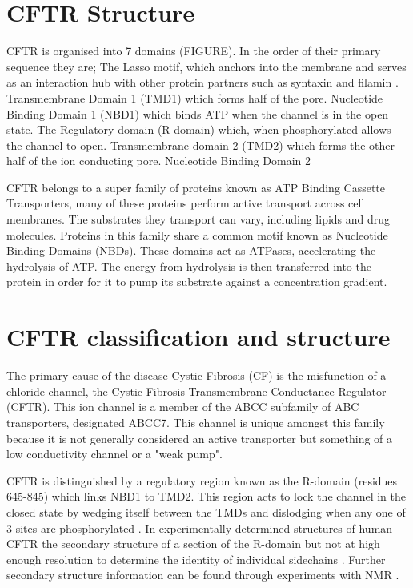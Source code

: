 \section{CFTR Structure}
CFTR is organised into 7 domains (FIGURE). In the order of their primary sequence they are; The Lasso motif, which anchors into the membrane and serves as an interaction hub with other protein partners such as syntaxin and filamin \cite{}. Transmembrane Domain 1 (TMD1) which forms half of the pore. Nucleotide Binding Domain 1 (NBD1) which binds ATP when the channel is in the open state. The Regulatory domain (R-domain) which, when phosphorylated allows the channel to open. Transmembrane domain 2 (TMD2) which forms the other half of the ion conducting pore. Nucleotide Binding Domain 2 

CFTR belongs to a super family of proteins known as ATP Binding Cassette Transporters,  many of these proteins perform active transport across cell membranes. The substrates they transport can vary, including lipids and drug molecules. Proteins in this family share a common motif known as Nucleotide Binding Domains (NBDs). These domains act as ATPases, accelerating the hydrolysis of ATP. The energy from hydrolysis is then transferred into the protein in order for it to pump its substrate against a concentration gradient. 

\section{CFTR classification and structure}

The primary cause of the disease Cystic Fibrosis (CF) is the misfunction of a chloride channel, the Cystic Fibrosis Transmembrane Conductance Regulator (CFTR). This ion channel is a member of the ABCC subfamily of ABC transporters, designated ABCC7. This channel is unique amongst this family because it is not generally considered an active transporter but something of a low conductivity channel or a "weak pump"\cite{Linsdell2018}.

CFTR is distinguished by a regulatory region known as the R-domain (residues 645-845) which links NBD1 to TMD2. This region acts to lock the channel in the closed state by wedging itself between the TMDs and dislodging when any one of 3 sites are phosphorylated \cite{Mihalyi2020}. In experimentally determined structures of human CFTR the secondary structure of a section of the R-domain but not at high enough resolution to determine the identity of individual sidechains \cite{Zhang2018}\cite{Zhang2016}. Further secondary structure information can be found through experiments with NMR \cite{Baker2007}.

